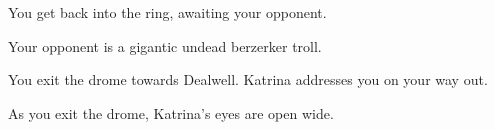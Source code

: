 
You get back into the ring, awaiting your opponent.


Your opponent is a gigantic undead berzerker troll. %




You exit the drome towards Dealwell. Katrina addresses you on your way out.






As you exit the drome, Katrina's eyes are open wide.



